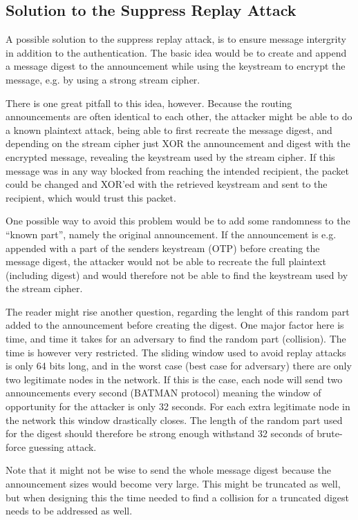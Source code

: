 \subsection{Solution to the Suppress Replay Attack}
A possible solution to the suppress replay attack, is to ensure message
intergrity in addition to the authentication. The basic idea would be to create
and append a message digest to the announcement while using the keystream to
encrypt the message, e.g. by using a strong stream cipher.

There is one great pitfall to this idea, however. Because the routing
announcements are often identical to each other, the attacker might be able to
do a known plaintext attack, being able to first recreate the message digest,
and depending on the stream cipher just XOR the announcement and digest with the
encrypted message, revealing the keystream used by the stream cipher. If this
message was in any way blocked from reaching the intended recipient, the packet
could be changed and XOR'ed with the retrieved keystream and sent to the
recipient, which would trust this packet.

One possible way to avoid this problem would be to add some randomness to the
``known part'', namely the original announcement. If the announcement is e.g.
appended with a part of the senders keystream (\ac{OTP}) before creating the
message digest, the attacker would not be able to recreate the full plaintext
(including digest) and would therefore not be able to find the keystream used by
the stream cipher.

The reader might rise another question, regarding the lenght of this random part
added to the announcement before creating the digest. One major factor here is
time, and time it takes for an adversary to find the random part (collision).
The time is however very restricted. The sliding window used to avoid replay
attacks is only 64 bits long, and in the worst case (best case for adversary)
there are only two legitimate nodes in the network. If this is the case, each
node will send two announcements every second (BATMAN protocol) meaning the
window of opportunity for the attacker is only 32 seconds. For each extra
legitimate node in the network this window drastically closes. The length of the
random part used for the digest should therefore be strong enough withstand 32
seconds of brute-force guessing attack.

Note that it might not be wise to send the whole message digest because the
announcement sizes would become very large. This might be truncated as well, but
when designing this the time needed to find a collision for a truncated digest
needs to be addressed as well.

